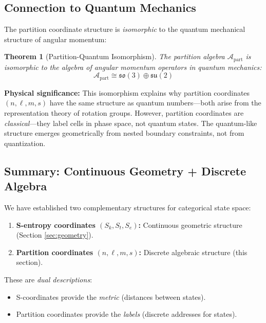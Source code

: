 \documentclass[twocolumn,10pt]{article}
\newtheorem{theorem}{Theorem}[section]
\theoremstyle{remark}
\begin{document}
\subsection{Connection to Quantum Mechanics}

The partition coordinate structure is \textit{isomorphic} to the quantum mechanical structure of angular momentum:

\begin{theorem}[Partition-Quantum Isomorphism]
\label{thm:partition_quantum_isomorphism}
The partition algebra $\mathcal{A}_{\text{part}}$ is isomorphic to the algebra of angular momentum operators in quantum mechanics:
\begin{equation}
    \mathcal{A}_{\text{part}} \cong \mathfrak{so}(3) \oplus \mathfrak{su}(2)
    \label{eq:algebra_isomorphism}
\end{equation}
\end{theorem}

\textbf{Physical significance:} This isomorphism explains why partition coordinates $(n, \ell, m, s)$ have the same structure as quantum numbers—both arise from the representation theory of rotation groups. However, partition coordinates are \textit{classical}—they label cells in phase space, not quantum states. The quantum-like structure emerges geometrically from nested boundary constraints, not from quantization.

\subsection{Summary: Continuous Geometry + Discrete Algebra}

We have established two complementary structures for categorical state space:

\begin{enumerate}
    \item \textbf{S-entropy coordinates $(S_k, S_t, S_e)$:} Continuous geometric structure (Section \ref{sec:geometry}).
    \item \textbf{Partition coordinates $(n, \ell, m, s)$:} Discrete algebraic structure (this section).
\end{enumerate}

These are \textit{dual descriptions}:
\begin{itemize}
    \item S-coordinates provide the \textit{metric} (distances between states).
    \item Partition coordinates provide the \textit{labels} (discrete addresses for states).
\end{itemize}
\end{document}
